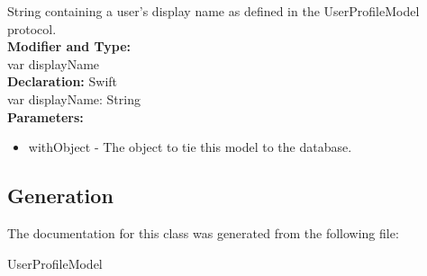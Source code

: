 String containing a user’s display name as defined in the UserProfileModel protocol.\\

\textbf{Modifier and Type:}\\
\tab var displayName\\


\textbf{Declaration:}
\tab 
Swift\\

var displayName: String\\

\textbf{Parameters:}
\begin{itemize}
\item withObject - The  object to tie this model to the  database.
\end{itemize}


\subsection{Generation}
The documentation for this class was generated from the following file\-:
\begin{DoxyCompactItemize}
\item UserProfileModel
\end{DoxyCompactItemize} 










